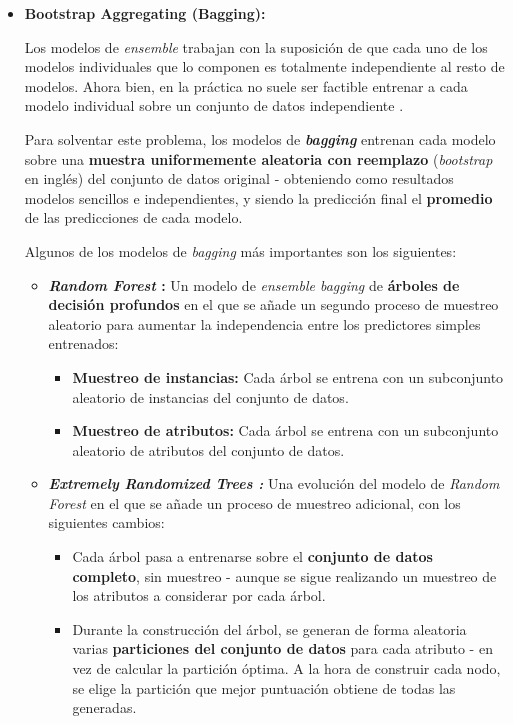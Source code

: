 \begin{itemize}[leftmargin=*]

	\item \textbf{Bootstrap Aggregating (Bagging):} 
	
	Los modelos de \textit{ensemble} trabajan con la suposición de que cada uno de los modelos individuales que lo componen es totalmente independiente al resto de modelos. Ahora bien, en la práctica no suele ser factible entrenar a cada modelo individual sobre un conjunto de datos independiente \cite{baggingart}. 
	
	Para solventar este problema, los modelos de \textbf{\textit{bagging}} entrenan cada modelo sobre una \textbf{muestra uniformemente aleatoria con reemplazo} (\textit{bootstrap} en inglés) del conjunto de datos original \cite{baggingart} - obteniendo como resultados modelos sencillos e independientes, y siendo la predicción final el \textbf{promedio} de las predicciones de cada modelo.

	Algunos de los modelos de \textit{bagging} más importantes son los siguientes:
	
	\begin{itemize}
		\item \textbf{\textit{Random Forest} \cite{randomforests}:} Un modelo de \textit{ensemble bagging} de \textbf{árboles de decisión profundos} en el que se añade un segundo proceso de muestreo aleatorio para aumentar la independencia entre los predictores simples entrenados:
		\begin{itemize}
			\item \textbf{Muestreo de instancias:} Cada árbol se entrena con un subconjunto aleatorio de instancias del conjunto de datos.
			\item \textbf{Muestreo de atributos:} Cada árbol se entrena con un subconjunto aleatorio de atributos del conjunto de datos.
		\end{itemize}
		\item \textbf{\textit{Extremely Randomized Trees \cite{Geurts2006}:}} Una evolución del modelo de \textit{Random Forest} en el que se añade un proceso de muestreo adicional, con los siguientes cambios:
		\begin{itemize}
			\item Cada árbol pasa a entrenarse sobre el \textbf{conjunto de datos completo}, sin muestreo - aunque se sigue realizando un muestreo de los atributos a considerar por cada árbol.
			\item Durante la construcción del árbol, se generan de forma aleatoria varias \textbf{particiones del conjunto de datos} para cada atributo - en vez de calcular la partición óptima. A la hora de construir cada nodo, se elige la partición que mejor puntuación obtiene de todas las generadas.
		\end{itemize}
	\end{itemize}
	

\end{itemize}
